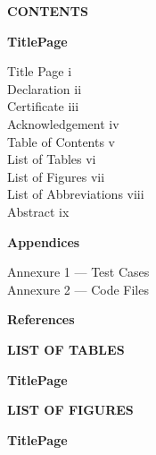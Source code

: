 \documentclass[12pt,a4paper,oneside,openany]{report}
\newcommand{\pmpage}[1]{%
  \clearpage\thispagestyle{fancy}%
  \begin{center}\bfseries\fontsize{14}{18}\selectfont #1\end{center}%
  \vspace{0.6em}}
\begin{document}
\pmpage{CONTENTS}
{\bfseries\fontsize{12}{18}\selectfont Title\hfill Page\par}
\vspace{0.4em}
{\fontsize{12}{18}\selectfont
Title Page \dotfill i\\
Declaration \dotfill ii\\
Certificate \dotfill iii\\
Acknowledgement \dotfill iv\\
Table of Contents \dotfill v\\
List of Tables \dotfill vi\\
List of Figures \dotfill vii\\
List of Abbreviations \dotfill viii\\
Abstract \dotfill ix\par}
\vspace{0.6em}
\tableofcontents
\vspace{0.6em}
{\bfseries\fontsize{12}{18}\selectfont Appendices\par}
\vspace{0.3em}
{\fontsize{12}{18}\selectfont
Annexure 1 --- Test Cases \dotfill \pageref{annex:testcases}\\
Annexure 2 --- Code Files \dotfill \pageref{annex:code}\par}
\vspace{0.6em}
{\bfseries\fontsize{12}{18}\selectfont References \dotfill \pageref{page:references}\par}

\pmpage{LIST OF TABLES}
{\bfseries\fontsize{12}{18}\selectfont Title\hfill Page\par}
\vspace{0.4em}
\listoftables

\pmpage{LIST OF FIGURES}
{\bfseries\fontsize{12}{18}\selectfont Title\hfill Page\par}
\vspace{0.4em}
\listoffigures
\end{document}
